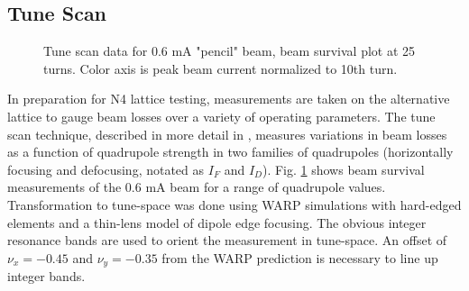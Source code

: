 \subsection{Tune Scan}

\begin{figure}[]
 	\caption{Tune scan data for 0.6 mA "pencil" beam, beam survival plot at 25 turns. Color axis is peak beam current normalized to 10th turn.}
   \label{fig:oct-tune-scan-pencil}
\end{figure}


In preparation for N4 lattice testing, measurements are taken on the alternative lattice to gauge beam losses over a variety of operating parameters. The tune scan technique, described in more detail in \cite{tunescan}, measures variations in beam losses as a function of quadrupole strength in two families of quadrupoles (horizontally focusing and defocusing, notated as $I_F$ and $I_D$). Fig. \ref{fig:oct-tune-scan-pencil} shows beam survival measurements of the 0.6 mA beam for a range of quadrupole values.  Transformation to tune-space was done using WARP simulations with hard-edged elements and a thin-lens model of dipole edge focusing. The obvious integer resonance bands are used to orient the measurement in tune-space. An offset of $\nu_x = -0.45$ and $\nu_y = -0.35$ from the WARP prediction is necessary to line up integer bands. 

